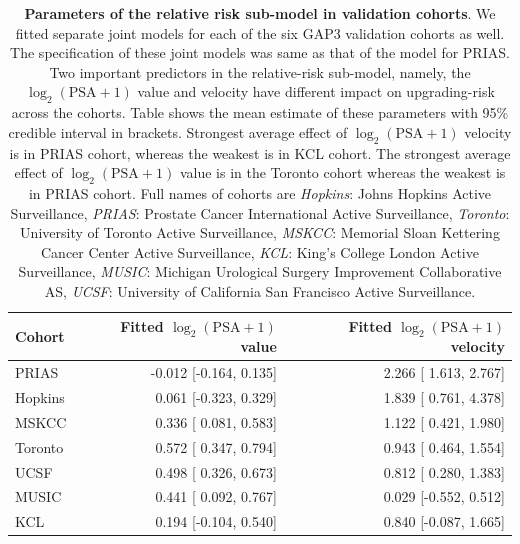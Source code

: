 \begin{table}
\small\sf\centering
\caption{\textbf{Parameters of the relative risk sub-model in validation cohorts}. We fitted separate joint models for each of the six GAP3 validation cohorts as well. The specification of these joint models was same as that of the model for PRIAS. Two important predictors in the relative-risk sub-model, namely, the $\log_2 (\mbox{PSA} + 1)$ value and velocity have different impact on upgrading-risk across the cohorts. Table shows the mean estimate of these parameters with 95\% credible interval in brackets. Strongest average effect of $\log_2 (\mbox{PSA} + 1)$ velocity is in PRIAS cohort, whereas the weakest is in KCL cohort. The strongest average effect of $\log_2 (\mbox{PSA} + 1)$ value is in the Toronto cohort whereas the weakest is in PRIAS cohort. Full names of cohorts are \textit{Hopkins}: Johns Hopkins Active Surveillance, \textit{PRIAS}: Prostate Cancer International Active Surveillance, \textit{Toronto}: University of Toronto Active Surveillance, \textit{MSKCC}: Memorial Sloan Kettering Cancer Center Active Surveillance, \textit{KCL}: King's College London Active Surveillance, \textit{MUSIC}: Michigan Urological Surgery Improvement Collaborative AS, \textit{UCSF}: University of California San Francisco Active Surveillance.}
\label{tab:PSA_survival_gap3}
\begin{tabular}{lrr}
\hline
Cohort & Fitted $\log_2 (\mbox{PSA} + 1)$ value & Fitted $\log_2 (\mbox{PSA} + 1)$ velocity\\
\hline
PRIAS & -0.012 [-0.164, 0.135] & 2.266 [ 1.613, 2.767]\\
Hopkins & 0.061 [-0.323, 0.329] & 1.839 [ 0.761, 4.378]\\
MSKCC & 0.336 [ 0.081, 0.583] & 1.122 [ 0.421, 1.980]\\
Toronto & 0.572 [ 0.347, 0.794] & 0.943 [ 0.464, 1.554]\\
UCSF & 0.498 [ 0.326, 0.673] & 0.812 [ 0.280, 1.383]\\
MUSIC & 0.441 [ 0.092, 0.767] & 0.029 [-0.552, 0.512]\\
KCL &  0.194 [-0.104, 0.540] & 0.840 [-0.087, 1.665]\\
\hline
\end{tabular}
\end{table}

